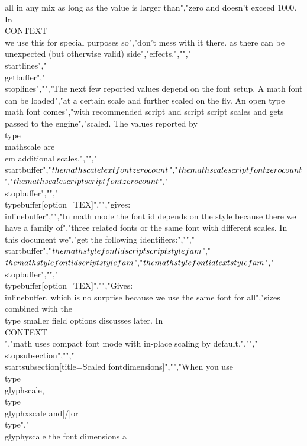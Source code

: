 all in any mix as long as the value is larger than","zero and doesn't exceed 1000. In \\CONTEXT\\ we use this for special purposes so","don't mess with it there. as there can be unexpected (but otherwise valid) side","effects.","","\\startlines","\\getbuffer","\\stoplines","","The next few reported values depend on the font setup. A math font can be loaded","at a certain scale and further scaled on the fly. An open type math font comes","with recommended script and script script scales and gets passed to the engine","scaled. The values reported by \\type {\\mathscale} are {\\em additional} scales.","","\\startbuffer","$\\the\\mathscale\\textfont        \\zerocount$","$\\the\\mathscale\\scriptfont      \\zerocount$","$\\the\\mathscale\\scriptscriptfont\\zerocount$","\\stopbuffer","","\\typebuffer[option=TEX]","","gives: \\inlinebuffer","","In math mode the font id depends on the style because there we have a family of","three related fonts or the same font with different scales. In this document we","get the following identifiers:","","\\startbuffer","$\\the\\mathstylefontid\\scriptscriptstyle \\fam$","$\\the\\mathstylefontid\\scriptstyle       \\fam$","$\\the\\mathstylefontid\\textstyle         \\fam$","\\stopbuffer","","\\typebuffer[option=TEX]","","Gives: \\inlinebuffer, which is no surprise because we use the same font for all","sizes combined with the \\type {smaller} field options discusses later. In \\CONTEXT\\","math uses compact font mode with in-place scaling by default.","","\\stopsubsection","","\\startsubsection[title={Scaled fontdimensions}]","","When you use \\type {\\glyphscale}, \\type {\\glyphxscale} and|/|or \\type","{\\glyphyscale} the font dimensions a